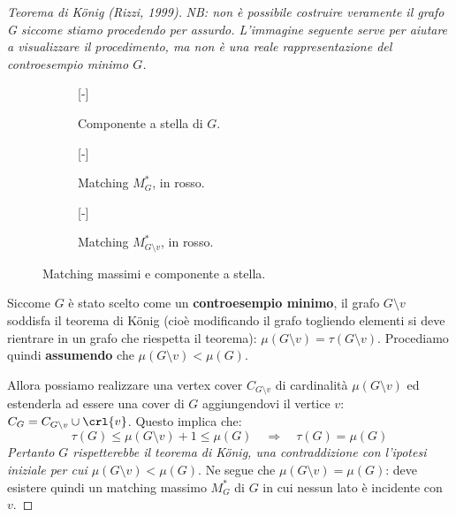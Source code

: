 \documentclass[\main/main.tex]{subfiles}
\begin{document}
\begin{proof}[Teorema di König (Rizzi, 1999)]
	\textit{NB: non è possibile costruire veramente il grafo G siccome stiamo procedendo per assurdo. L'immagine seguente serve per aiutare a visualizzare il procedimento, ma non è una reale rappresentazione del controesempio minimo \(G\).}

	\begin{figure}
		\begin{subfigure}{0.33\textwidth}
			[-]
			\MinimalGraph{}
			\caption{Componente a stella di \(G\).}
		\end{subfigure}
		\begin{subfigure}{0.33\textwidth}
			[-]
			\MinimalGraph{}
			\caption{Matching \(M^*_G\), in rosso.}
		\end{subfigure}
		\begin{subfigure}{0.33\textwidth}
			[-]
			\MinimalGraph{}
			\caption{Matching \(M^*_{G\setminus v}\), in rosso.}
		\end{subfigure}
		\caption{Matching massimi e componente a stella.}
	\end{figure}
	Siccome \(G\) è stato scelto come un \textbf{controesempio minimo}, il grafo \(G\setminus v\) soddisfa il teorema di König (cioè modificando il grafo togliendo elementi si deve rientrare in un grafo che riespetta il teorema): \(\mu(G\setminus v) = \tau(G\setminus v)\). Procediamo quindi \textbf{assumendo} che \(\mu(G\setminus v)<\mu(G)\).

	Allora possiamo realizzare una vertex cover \(C_{G\setminus v}\) di cardinalità \(\mu(G\setminus v)\) ed estenderla ad essere una cover di \(G\) aggiungendovi il vertice \(v\): \(C_{G} = C_{G\setminus v} \cup \crl{v}\). Questo implica che:
	\[
		\tau(G) \leq \mu(G\setminus v) + 1 \leq \mu(G) \quad \Rightarrow \quad  \tau(G) = \mu(G)
	\]
	\textit{Pertanto \(G\) rispetterebbe il teorema di König, una contraddizione con l'ipotesi iniziale per cui \(\mu(G\setminus v)<\mu(G)\)}. Ne segue che \(\mu(G\setminus v) = \mu(G)\): deve esistere quindi un matching massimo \(M^*_G\) di \(G\) in cui nessun lato è incidente con \(v\).


\end{proof}
\end{document}
